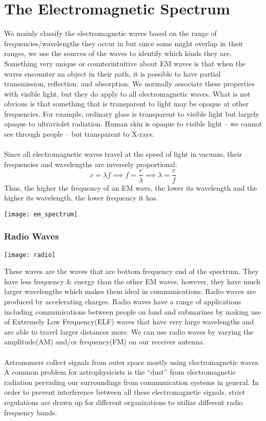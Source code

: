 \documentclass[11pt]{article}
\begin{document}
	\section*{The Electromagnetic Spectrum}
	We mainly classify the electromagnetic waves based on the range of frequencies/wavelengths they occur in but since some might overlap in their ranges, we use the sources of the waves to identify which kinds they are. Something very unique or counterintuitive about EM waves is that when the waves encounter an object in their path, it is possible to have partial transmission, reflection, and absorption. We normally associate these properties with visible light, but they do apply to all electromagnetic waves. What is not obvious is that something that is transparent to light may be opaque at other frequencies. For example, ordinary glass is transparent to visible light but largely opaque to ultraviolet radiation. Human skin is opaque to visible light -- we cannot see through people -- but transparent to X-rays. \\ \\
	Since all electromagnetic waves travel at the speed of light in vacuum, their frequencies and wavelengths are inversely proportional.
	$$c=\lambda f\implies f=\dfrac{c}{\lambda}\implies \lambda=\dfrac{c}{f}$$
	Thus, the higher the frequency of an EM wave, the lower its wavelength and the higher its wavelength, the lower frequency it has.
	\begin{center}
		\texttt{[image: em\_spectrum]}
	\end{center}
	\subsubsection*{Radio Waves}
	\begin{center}
		\texttt{[image: radio]}
	\end{center}
	These waves are the waves that are bottom frequency end of the spectrum. They have less frequency \& energy than the other EM waves, however, they have much larger wavelengths which makes them ideal in communications. Radio waves are produced by accelerating charges. Radio waves have a range of applications including communications between people on land and submarines by making use of Extremely Low Frequency(ELF) waves that have very large wavelengths and are able to travel larger distances more. We can use radio waves by varying the amplitude(AM) and/or frequency(FM) on our receiver antenna. \\ \\
	Astronomers collect signals from outer space mostly using electromagnetic waves. A common problem for astrophysicists is the “dust” from electromagnetic radiation pervading our surroundings from communication systems in general. In order to prevent interference between all these electromagnetic signals, strict regulations are drawn up for different organizations to utilize different radio frequency bands.
\end{document}
